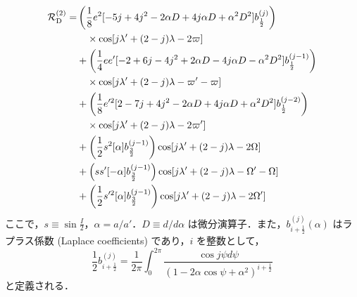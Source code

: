 \documentclass[11pt,a4paper,oneside,onecolumn]{jarticle}
\begin{document}
\begin{equation}
\begin{split}
{\cal R}_{\rm D}^{(2)} = & \left( \frac{1}{8} e^2 [-5 j + 4 j^2 - 2 \alpha D + 4 j \alpha D + \alpha^2 D^2] b_{ \frac{1}{2} }^{(j)} \right) \\
& \quad \times \cos [j \lambda' + (2 - j) \lambda - 2 \varpi ] \\
& + \left( \frac{1}{4} e e' [ -2 + 6 j - 4 j^2 + 2 \alpha D - 4 j \alpha D - \alpha^2 D^2] b_{ \frac{1}{2} }^{(j - 1)} \right) \\
& \quad \times \cos [j \lambda' + (2 -j) \lambda - \varpi' - \varpi ] \\
& + \left( \frac{1}{8} e'^2 [2 -7 j + 4 j^2 - 2 \alpha D + 4 j \alpha D + \alpha^2 D^2] b_{ \frac{1}{2} }^{(j - 2)} \right) \\
& \quad \times \cos [j \lambda' + (2 - j) \lambda - 2 \varpi' ] \\
& + \left( \frac{1}{2} s^2 [ \alpha ] b_{ \frac{3}{2} }^{(j - 1)} \right) \cos [j \lambda' + (2 - j) \lambda - 2 \Omega ] \\
& + \left( s s' [ - \alpha ] b_{ \frac{3}{2} }^{(j - 1)} \right) \cos [j \lambda' + (2 - j) \lambda - \Omega' - \Omega] \\
& + \left( \frac{1}{2} s'^2 [ \alpha ] b_{ \frac{3}{2} }^{(j - 1)} \right) \cos [j \lambda' + (2 - j) \lambda - 2 \Omega' ]
\end{split} \label{eq:cal_RD(2)}
\end{equation}
ここで，$s \equiv \sin \frac{I}{2}$，$\alpha = a/a'$．$D \equiv d/d \alpha$ は微分演算子．また，$b_{i + \frac{1}{2}}^{(j)}(\alpha)$ はラプラス係数 (Laplace coefficients) であり，$i$ を整数として，
\begin{equation}
\frac{1}{2} b_{i + \frac{1}{2}}^{(j)} = \frac{1}{2 \pi} \int_0^{2 \pi} \frac{\cos j \psi d \psi}{(1 - 2 \alpha \cos \psi + \alpha^2)^{i + \frac{1}{2}}}
\end{equation}
と定義される．
\end{document}
